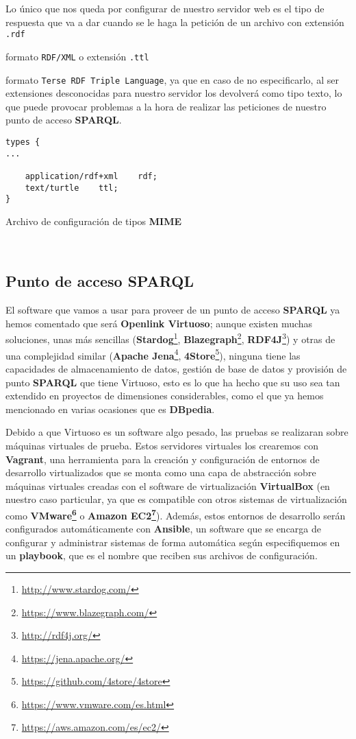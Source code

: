 Lo único que nos queda por configurar de nuestro servidor web es el tipo de respuesta que va a dar cuando se le haga la petición de un archivo con extensión {\tt .rdf} {formato {\tt RDF/XML} o extensión {\tt .ttl} {formato {\tt Terse RDF Triple Language}, ya que en caso de no especificarlo, al ser extensiones desconocidas para nuestro servidor los devolverá como tipo texto, lo que puede provocar problemas a la hora de realizar las peticiones de nuestro punto de acceso {\bf SPARQL}.

\bigskip
\begin{listing}[!ht]
\begin{verbatim}
types {
...

    application/rdf+xml    rdf;
    text/turtle    ttl;
}
\end{verbatim}
\caption{Archivo de configuración de tipos {\bf MIME}}
\end{listing}

\newpage
\
\newpage
\subsection{Punto de acceso SPARQL}

El software que vamos a usar para proveer de un punto de acceso {\bf SPARQL} ya hemos comentado que será {\bf Openlink Virtuoso}; aunque existen muchas soluciones, unas más sencillas ({\bf Stardog}\footnote{\url{http://www.stardog.com/}}, {\bf Blazegraph}\footnote{\url{https://www.blazegraph.com/}}, {\bf RDF4J}{\footnote{\url{http://rdf4j.org/}}}) y otras de una complejidad similar ({\bf Apache Jena}{\footnote{\url{https://jena.apache.org/}}}, {\bf 4Store}\footnote{\url{https://github.com/4store/4store}}), ninguna tiene las capacidades de almacenamiento de datos, gestión de base de datos y provisión de punto {\bf SPARQL} que tiene Virtuoso, esto es lo que ha hecho que su uso sea tan extendido en proyectos de dimensiones considerables, como el que ya hemos mencionado en varias ocasiones que es {\bf DBpedia}.

\bigskip
Debido a que Virtuoso es un software algo pesado, las pruebas se realizaran sobre máquinas virtuales de prueba. Estos servidores virtuales los crearemos con {\bf Vagrant}, una herramienta para la creación y configuración de entornos de desarrollo virtualizados que se monta como una capa de abstracción sobre máquinas virtuales creadas con el software de virtualización {\bf VirtualBox} (en nuestro caso particular, ya que es compatible con otros sistemas de virtualización como {\bf VMware\footnote{\url{https://www.vmware.com/es.html}}} o {\bf Amazon EC2\footnote{\url{https://aws.amazon.com/es/ec2/}}}). Además, estos entornos de desarrollo serán configurados automáticamente con {\bf Ansible}, un software que se encarga de configurar y administrar sistemas de forma automática según especifiquemos en un {\bf playbook}, que es el nombre que reciben sus archivos de configuración.

}}

